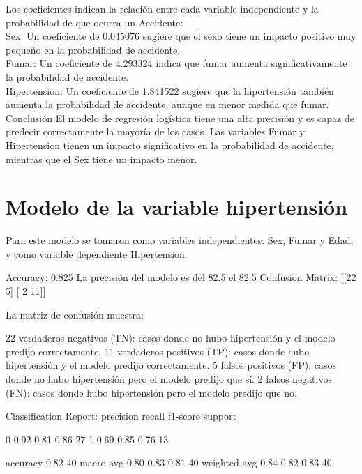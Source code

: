 \documentclass[a4paper, 12pt]{article}
\begin{document}
Los coeficientes indican la relación entre cada variable independiente y la probabilidad de que ocurra un Accidente:
\\
Sex: Un coeficiente de 0.045076 sugiere que el sexo tiene un impacto positivo muy pequeño en la probabilidad de accidente.
\\
Fumar: Un coeficiente de 4.293324 indica que fumar aumenta significativamente la probabilidad de accidente.
\\
Hipertension: Un coeficiente de 1.841522 sugiere que la hipertensión también aumenta la probabilidad de accidente, aunque en menor medida que fumar.
\\
Conclusión
El modelo de regresión logística tiene una alta precisión y es capaz de predecir correctamente 
la mayoría de los casos. Las variables Fumar y Hipertension tienen un impacto significativo en 
la probabilidad de accidente, mientras que el Sex tiene un impacto menor.

\section{Modelo de la variable hipertensión}

Para este modelo se tomaron como variables independientes: Sex, Fumar y Edad, y como
variable dependiente Hipertension.


Accuracy: 0.825
La precisión del modelo es del 82.5%
el 82.5%
Confusion Matrix:
[[22  5]
 [ 2 11]]

La matriz de confusión muestra:

22 verdaderos negativos (TN): casos donde no hubo hipertensión y el modelo predijo correctamente.
11 verdaderos positivos (TP): casos donde hubo hipertensión y el modelo predijo correctamente.
5 falsos positivos (FP): casos donde no hubo hipertensión pero el modelo predijo que sí.
2 falsos negativos (FN): casos donde hubo hipertensión pero el modelo predijo que no.

Classification Report:
              precision    recall  f1-score   support

           0       0.92      0.81      0.86        27
           1       0.69      0.85      0.76        13

    accuracy                           0.82        40
   macro avg       0.80      0.83      0.81        40
weighted avg       0.84      0.82      0.83        40
\end{document}
